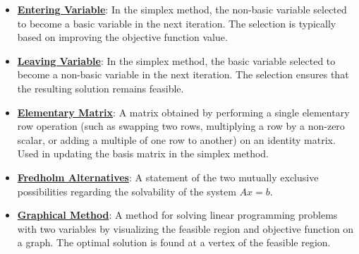 \documentclass{article}%
\begin{document}
\begin{itemize}[leftmargin=*]
\item \href{https://www.math.purdue.edu/~yipn/421/2024-10-03-DualSimplexMatrix.pdf#page=9}{\textbf{Entering Variable}}: In the simplex method, the non-basic variable selected to become a basic variable in the next iteration. The selection is typically based on improving the objective function value.%
\item \href{https://www.math.purdue.edu/~yipn/421/2024-10-03-DualSimplexMatrix.pdf#page=10}{\textbf{Leaving Variable}}: In the simplex method, the basic variable selected to become a non-basic variable in the next iteration. The selection ensures that the resulting solution remains feasible.%
\item \href{https://www.math.purdue.edu/~yipn/421/2024-10-03-DualSimplexMatrix.pdf#page=15}{\textbf{Elementary Matrix}}: A matrix obtained by performing a single elementary row operation (such as swapping two rows, multiplying a row by a non-zero scalar, or adding a multiple of one row to another) on an identity matrix. Used in updating the basis matrix in the simplex method.%
\item \href{https://www.math.purdue.edu/~yipn/421/2024-10-28-Farkas.pdf#page=3}{\textbf{Fredholm Alternatives}}: A statement of the two mutually exclusive possibilities regarding the solvability of the system $Ax = b$.%
\item \href{https://www.math.purdue.edu/~yipn/421/2024-12-03-Duality.pdf#page=3}{\textbf{Graphical Method}}: A method for solving linear programming problems with two variables by visualizing the feasible region and objective function on a graph. The optimal solution is found at a vertex of the feasible region.%
\end{itemize}

%
\end{document}
